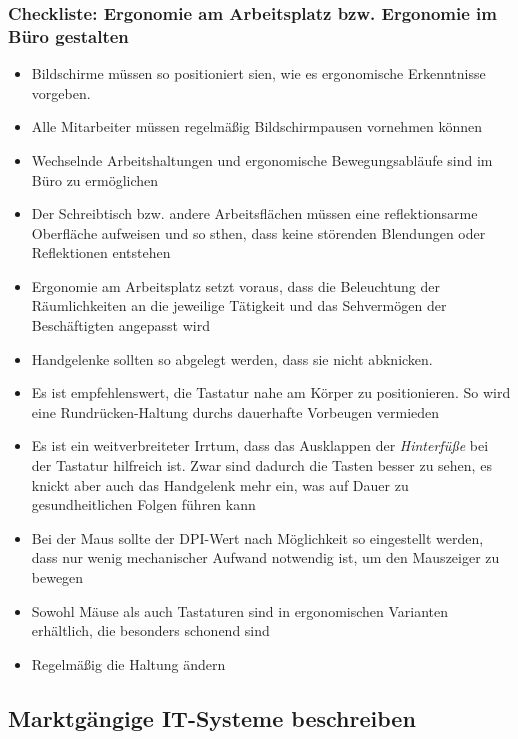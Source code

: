 \documentclass[a4paper, 12pt]{report}
\begin{document}
\subsubsection{Checkliste: Ergonomie am Arbeitsplatz bzw. Ergonomie im Büro 
gestalten}

\begin{itemize}
    \item Bildschirme müssen so positioniert sien, wie es ergonomische 
        Erkenntnisse vorgeben. 
    \item Alle Mitarbeiter müssen regelmäßig Bildschirmpausen vornehmen können
    \item Wechselnde Arbeitshaltungen und ergonomische Bewegungsabläufe sind im 
        Büro zu ermöglichen
    \item Der Schreibtisch bzw. andere Arbeitsflächen müssen eine 
        reflektionsarme Oberfläche aufweisen und so sthen, dass keine störenden 
        Blendungen oder Reflektionen entstehen
    \item Ergonomie am Arbeitsplatz setzt voraus, dass die Beleuchtung der 
        Räumlichkeiten an die jeweilige Tätigkeit und das Sehvermögen der 
        Beschäftigten angepasst wird
    \item Handgelenke sollten so abgelegt werden, dass sie nicht abknicken. 
    \item Es ist empfehlenswert, die Tastatur nahe am Körper zu positionieren. 
        So wird eine Rundrücken-Haltung durchs dauerhafte Vorbeugen vermieden
    \item Es ist ein weitverbreiteter Irrtum, dass das Ausklappen der 
        \emph{Hinterfüße} bei der Tastatur hilfreich ist. Zwar sind dadurch die 
        Tasten besser zu sehen, es knickt aber auch das Handgelenk mehr ein, was
        auf Dauer zu gesundheitlichen Folgen führen kann
    \item Bei der Maus sollte der DPI-Wert nach Möglichkeit so eingestellt 
        werden, dass nur wenig mechanischer Aufwand notwendig ist, um den 
        Mauszeiger zu bewegen
    \item Sowohl Mäuse als auch Tastaturen sind in ergonomischen Varianten 
        erhältlich, die besonders schonend sind
    \item Regelmäßig die Haltung ändern
\end{itemize}

\subsection{Marktgängige IT-Systeme beschreiben}
\end{document}
